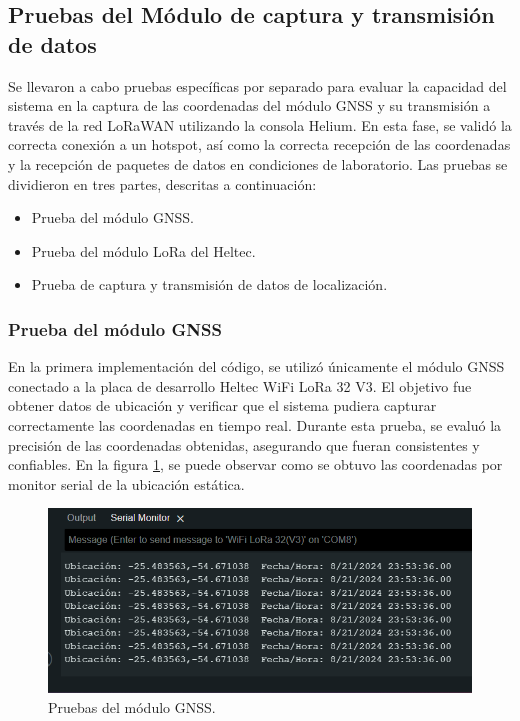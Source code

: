 \subsection{Pruebas del Módulo de captura y transmisión de datos}

Se llevaron a cabo pruebas específicas por separado para evaluar la capacidad del sistema en la captura de las coordenadas del módulo GNSS  y su transmisión a través de la red LoRaWAN utilizando la consola Helium. En esta fase, se validó la correcta conexión a un hotspot, así como la correcta recepción de las coordenadas y la recepción de paquetes de datos en condiciones de laboratorio. Las pruebas se dividieron en tres partes, descritas a continuación:

\begin{itemize}
\item  Prueba del módulo GNSS.
\item  Prueba del módulo LoRa del Heltec.
\item  Prueba de captura y transmisión de datos de localización.
\end{itemize}

\subsubsection{Prueba del módulo GNSS} 
En la primera implementación del código, se utilizó únicamente el módulo GNSS conectado a la placa de desarrollo Heltec WiFi LoRa 32 V3. El objetivo fue obtener datos de ubicación y verificar que el sistema pudiera capturar correctamente las coordenadas en tiempo real. Durante esta prueba, se evaluó la precisión de las coordenadas obtenidas, asegurando que fueran consistentes y confiables.
En la figura \ref{fig:gnss}, se puede observar como se obtuvo las coordenadas por monitor serial de la ubicación estática.

\begin{figure}[H]
\leavevmode
\begin{minipage}{\textwidth}
\begin{center}
\includegraphics[width=\textwidth]{./capitulo_05/imagen/gnss.png}
\caption{Pruebas del módulo GNSS.\label{fig:gnss}}
\end{center}
\end{minipage}
\end{figure}


